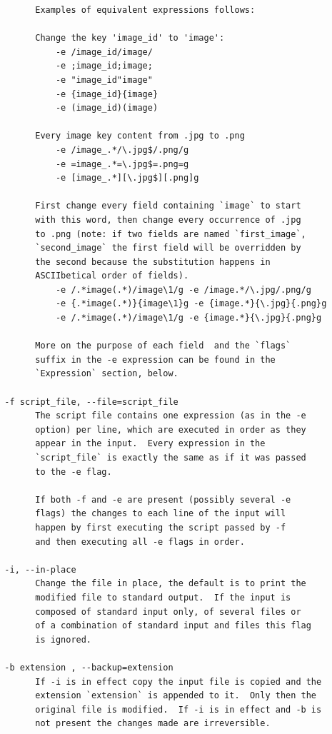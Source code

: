 \documentclass[11pt,a4paper,twoside,openright]{report}
\begin{document}
{\begin{verbatim}
        Examples of equivalent expressions follows:

        Change the key 'image_id' to 'image':
            -e /image_id/image/
            -e ;image_id;image;
            -e "image_id"image"
            -e {image_id}{image}
            -e (image_id)(image)

        Every image key content from .jpg to .png
            -e /image_.*/\.jpg$/.png/g
            -e =image_.*=\.jpg$=.png=g
            -e [image_.*][\.jpg$][.png]g

        First change every field containing `image` to start
        with this word, then change every occurrence of .jpg
        to .png (note: if two fields are named `first_image`,
        `second_image` the first field will be overridden by
        the second because the substitution happens in
        ASCIIbetical order of fields).
            -e /.*image(.*)/image\1/g -e /image.*/\.jpg/.png/g
            -e {.*image(.*)}{image\1}g -e {image.*}{\.jpg}{.png}g
            -e /.*image(.*)/image\1/g -e {image.*}{\.jpg}{.png}g

        More on the purpose of each field  and the `flags`
        suffix in the -e expression can be found in the
        `Expression` section, below.

  -f script_file, --file=script_file
        The script file contains one expression (as in the -e
        option) per line, which are executed in order as they
        appear in the input.  Every expression in the
        `script_file` is exactly the same as if it was passed
        to the -e flag.

        If both -f and -e are present (possibly several -e
        flags) the changes to each line of the input will
        happen by first executing the script passed by -f
        and then executing all -e flags in order.

  -i, --in-place
        Change the file in place, the default is to print the
        modified file to standard output.  If the input is
        composed of standard input only, of several files or
        of a combination of standard input and files this flag
        is ignored.

  -b extension , --backup=extension
        If -i is in effect copy the input file is copied and the
        extension `extension` is appended to it.  Only then the
        original file is modified.  If -i is in effect and -b is
        not present the changes made are irreversible.
\end{verbatim}
}
\end{document}

